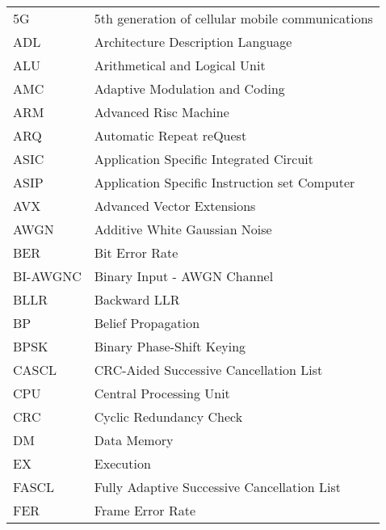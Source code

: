 \begin{center}

\begin{longtable}{ p{}  p{} } 

5G        & 5th generation of cellular mobile communications       \\
ADL       & Architecture Description Language                      \\
ALU       & Arithmetical and Logical Unit                          \\
AMC       & Adaptive Modulation and Coding                         \\
ARM       & Advanced Risc Machine                                  \\
ARQ       & Automatic Repeat reQuest                               \\
ASIC      & Application Specific Integrated Circuit                \\
ASIP      & Application Specific Instruction set Computer          \\
AVX       & Advanced Vector Extensions                             \\
AWGN      & Additive White Gaussian Noise                          \\
BER       & Bit Error Rate                                         \\
BI-AWGNC  & Binary Input - AWGN Channel                            \\
BLLR      & Backward LLR                                           \\
BP        & Belief Propagation                                     \\
BPSK      & Binary Phase-Shift Keying                              \\
CASCL     & CRC-Aided Successive Cancellation List                 \\
CPU       & Central Processing Unit                                \\
CRC       & Cyclic Redundancy Check                                \\
DM        & Data Memory                                            \\
EX        & Execution                                              \\
FASCL     & Fully Adaptive Successive Cancellation List            \\
FER       & Frame Error Rate                                       \\

\end{longtable}
\end{center}
